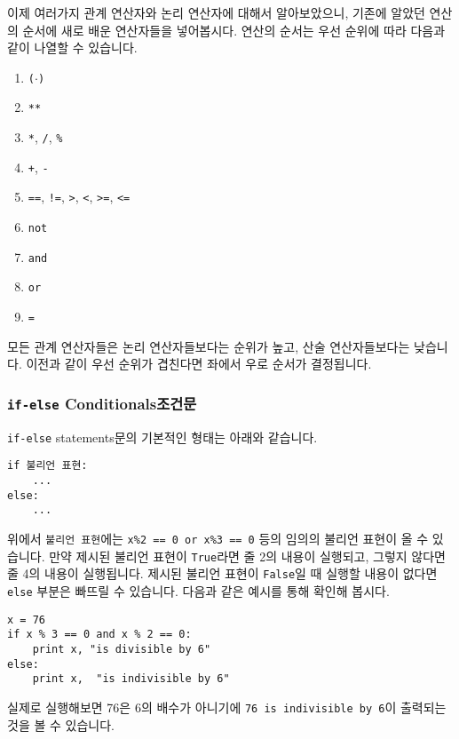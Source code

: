 \documentclass[../main.tex]{subfiles}
\begin{document}
이제 여러가지 관계 연산자와 논리 연산자에 대해서 알아보았으니, 기존에 알았던 연산의 순서에 새로 배운 연산자들을 넣어봅시다.
연산의 순서는 우선 순위에 따라 다음과 같이 나열할 수 있습니다.
\begin{enumerate}
	\item \texttt{($\cdot$)}
	\item \texttt{\texttt{**}}
	\item \texttt{*}, \texttt{/}, \texttt{\%}
	\item \texttt{+}, \texttt{-}
	\item \texttt{==}, \texttt{!=}, \texttt{>}, \texttt{<}, \texttt{>=}, \texttt{<=}
	\item \texttt{not}
	\item \texttt{and}
	\item \texttt{or}
	\item \texttt{=}
\end{enumerate}
모든 관계 연산자들은 논리 연산자들보다는 순위가 높고, 산술 연산자들보다는 낮습니다.
이전과 같이 우선 순위가 겹친다면 좌에서 우로 순서가 결정됩니다.

\subsubsection{\texttt{if-else} Conditionals조건문}
\texttt{if-else} statements문의 기본적인 형태는 아래와 같습니다.
\begin{verbatim}
if 불리언 표현:
	...
else:
	...
\end{verbatim}
위에서 \texttt{불리언 표현}에는 \texttt{x\%2 == 0 or x\%3 == 0} 등의 임의의 불리언 표현이 올 수 있습니다.
만약 제시된 불리언 표현이 \texttt{True}라면 줄 2의 내용이 실행되고, 그렇지 않다면 줄 4의 내용이 실행됩니다.
제시된 불리언 표현이 \texttt{False}일 때 실행할 내용이 없다면 \texttt{else} 부분은 빠뜨릴 수 있습니다.
다음과 같은 예시를 통해 확인해 봅시다.
\begin{verbatim}
x = 76
if x % 3 == 0 and x % 2 == 0:
	print x, "is divisible by 6"
else:
	print x,  "is indivisible by 6"
\end{verbatim}
실제로 실행해보면 76은 6의 배수가 아니기에 \texttt{76 is indivisible by 6}이 출력되는 것을 볼 수 있습니다.
\end{document}
